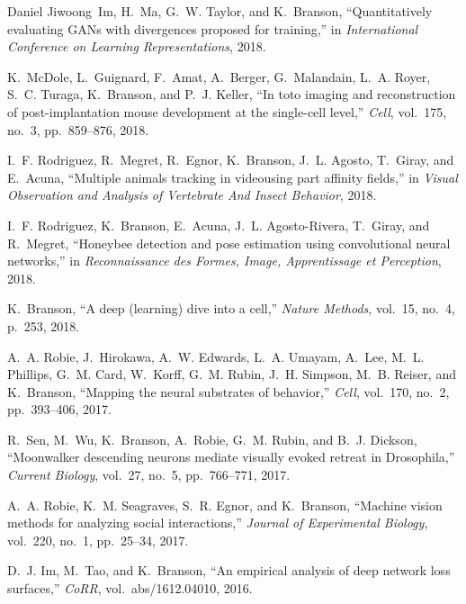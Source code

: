 \begin{cvenum}
\item Daniel Jiwoong~Im, H.~Ma, G.~W. Taylor, and K.~Branson,
  ``Quantitatively evaluating {GAN}s with divergences proposed for training,''
  in {\em International Conference on Learning Representations},
  2018.

\item K.~McDole, L.~Guignard, F.~Amat, A.~Berger, G.~Malandain, L.~A. Royer, S.~C.
  Turaga, K.~Branson, and P.~J. Keller, ``In toto imaging and reconstruction of
  post-implantation mouse development at the single-cell level,'' {\em Cell},
  vol.~175, no.~3, pp.~859--876, 2018.

\item I.~F. Rodriguez, R.~Megret, R.~Egnor, K.~Branson, J.~L. Agosto, T.~Giray, and
  E.~Acuna, ``Multiple animals tracking in videousing part affinity fields,''
  in {\em Visual Observation and Analysis of Vertebrate And Insect Behavior},
  2018.

\item I.~F. Rodriguez, K.~Branson, E.~Acuna, J.~L. Agosto-Rivera, T.~Giray, and
  R.~Megret, ``Honeybee detection and pose estimation using convolutional
  neural networks,'' in {\em Reconnaissance des Formes, Image, Apprentissage et
  Perception}, 2018.

\item K.~Branson, ``A deep (learning) dive into a cell,'' {\em Nature Methods},
  vol.~15, no.~4, p.~253, 2018.

\item A.~A. Robie, J.~Hirokawa, A.~W. Edwards, L.~A. Umayam,
  A.~Lee, M.~L. Phillips, G.~M. Card, W.~Korff, G.~M. Rubin, J.~H. Simpson,
  M.~B. Reiser, and K.~Branson, ``Mapping the neural substrates of behavior,''
  {\em Cell}, vol.~170, no.~2, pp.~393--406, 2017.

\item R.~Sen, M.~Wu, K.~Branson, A.~Robie, G.~M. Rubin, and B.~J. Dickson,
  ``Moonwalker descending neurons mediate visually evoked retreat in
  {D}rosophila,'' {\em Current Biology}, vol.~27, no.~5, pp.~766--771, 2017.

\item A.~A. Robie, K.~M. Seagraves, S.~R. Egnor, and K.~Branson, ``Machine vision
  methods for analyzing social interactions,'' {\em Journal of Experimental
  Biology}, vol.~220, no.~1, pp.~25--34, 2017.

\item D.~J. Im, M.~Tao, and K.~Branson, ``An empirical analysis of deep network loss
  surfaces,'' {\em CoRR}, vol.~abs/1612.04010, 2016.


\end{cvenum}
